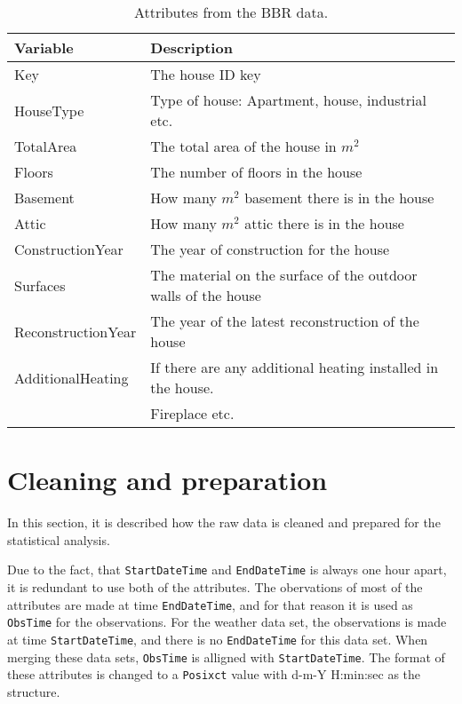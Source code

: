 \begin{table}[H]
    \centering
    \begin{tabular}{ll}
     \hline
     \textbf{Variable} & \textbf{Description} \\
    \hline
    \hline
    Key  &  The house ID key\\
    HouseType  &  Type of house: Apartment, house, industrial etc. \\
    TotalArea  & The total area of the house in $m^2$ \\
    Floors  & The number of floors in the house \\
    Basement  & How many $m^2$ basement there is in the house \\
    Attic  & How many $m^2$ attic there is in the house \\
    ConstructionYear  & The year of construction for the house  \\
    Surfaces  & The material on the surface of the outdoor walls of the house \\
    ReconstructionYear  & The year of the latest reconstruction of the house \\
    AdditionalHeating  & If there are any additional heating installed in the house. \\ & Fireplace etc. \\
    \hline
    \end{tabular}
    \caption{Attributes from the BBR data.}
    \label{tab: BBR}
\end{table}




\section{Cleaning and preparation}
In this section, it is described how the raw data is cleaned and prepared for the statistical analysis.

\noindent Due to the fact, that \texttt{StartDateTime} and \texttt{EndDateTime} is always one hour apart, it is redundant to use both of the attributes. The obervations of most of the attributes are made at time \texttt{EndDateTime}, and for that reason it is used as \texttt{ObsTime} for the observations. For the weather data set, the observations is made at time \texttt{StartDateTime}, and there is no \texttt{EndDateTime} for this data set. When merging these data sets, \texttt{ObsTime} is alligned with \texttt{StartDateTime}. The format of these attributes is changed to a \texttt{Posixct} value with d-m-Y H:min:sec as the structure.

